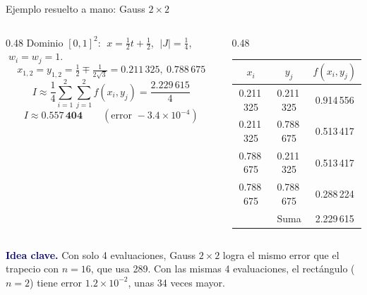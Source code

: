 \documentclass[aspectratio=169,10pt]{beamer}
\newcommand{\ideaclave}[1]{\begin{clave}\small\textbf{\textcolor{navy}{Idea clave.}} #1\end{clave}}
\begin{document}
\begin{frame}{Ejemplo resuelto a mano: Gauss $2\times2$}
\begin{columns}[T]
\begin{column}{0.48\textwidth}
\small
Dominio $[0,1]^2$: $\;x=\tfrac12 t+\tfrac12$, $\;|J|=\tfrac14$, $\;w_i=w_j=1$.
\[
x_{1,2}=y_{1,2}=\tfrac12\mp\tfrac{1}{2\sqrt3}=0.211\,325,\ 0.788\,675
\]
\[
I\approx\frac14\sum_{i=1}^{2}\sum_{j=1}^{2}f(x_i,y_j)=\frac{2.229\,615}{4}
\]
\[
I\approx\mathbf{0.557\,404}\qquad (\text{error } -3.4\times10^{-4})
\]
\end{column}
\begin{column}{0.48\textwidth}
\centering\small
\begin{tabular}{@{}ccc@{}}
\toprule
$x_i$ & $y_j$ & $f(x_i,y_j)$\\
\midrule
0.211\,325 & 0.211\,325 & 0.914\,556\\
0.211\,325 & 0.788\,675 & 0.513\,417\\
0.788\,675 & 0.211\,325 & 0.513\,417\\
0.788\,675 & 0.788\,675 & 0.288\,224\\
\midrule
 & Suma & 2.229\,615\\
\bottomrule
\end{tabular}
\end{column}
\end{columns}
\ideaclave{Con \alert{solo 4 evaluaciones}, Gauss $2\times2$ logra el mismo error que el trapecio con $n=16$, que usa \alert{289}. Con las mismas 4 evaluaciones, el rect\'angulo ($n=2$) tiene error $1.2\times10^{-2}$, unas 34 veces mayor.}
\end{frame}
\end{document}
